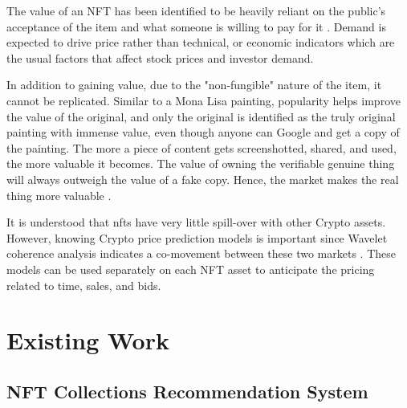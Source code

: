 \documentclass[conference]{IEEEtran}
\begin{document}

The value of an NFT has been identified to be heavily reliant on the public's acceptance of the item and what someone is willing to pay for it \autocite{conti_what_2021}. Demand is expected to drive price rather than technical, or economic indicators which are the usual factors that affect stock prices and investor demand.

\bigbreak
In addition to gaining value, due to the "non-fungible" nature of the item, it cannot be replicated. Similar to a Mona Lisa painting, popularity helps improve the value of the original, and only the original is identified as the truly original painting with immense value, even though anyone can Google and get a copy of the painting. The more a piece of content gets screenshotted, shared, and used, the more valuable it becomes. The value of owning the verifiable genuine thing will always outweigh the value of a fake copy. Hence, the market makes the real thing more valuable \autocite{noauthor_erc-721_nodate}.

It is understood that \gls{nft}s have very little spill-over with other Crypto assets. However, knowing Crypto price prediction models is important since Wavelet coherence analysis indicates a co-movement between these two markets \autocite{dowling_is_2021}.
These models can be used separately on each NFT asset to anticipate the pricing related to time, sales, and bids.


\section{Existing Work}

\subsection{NFT Collections Recommendation System}
\end{document}
